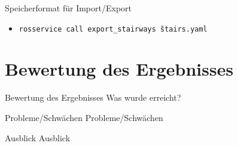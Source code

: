 \documentclass[18pt]{beamer}
\begin{document}
\begin{frame}{Speicherformat für Import/Export}
	\begin{itemize}
		\item \texttt{rosservice call export\_stairways \~stairs.yaml}
	\end{itemize}

\end{frame}



\section{Bewertung des Ergebnisses}

\begin{frame}{Bewertung des Ergebnisses}
Was wurde erreicht?
\end{frame}

\begin{frame}{Probleme/Schwächen}
Probleme/Schwächen
\end{frame}

\begin{frame}{Ausblick}
Ausblick
\end{frame}







\end{document}
